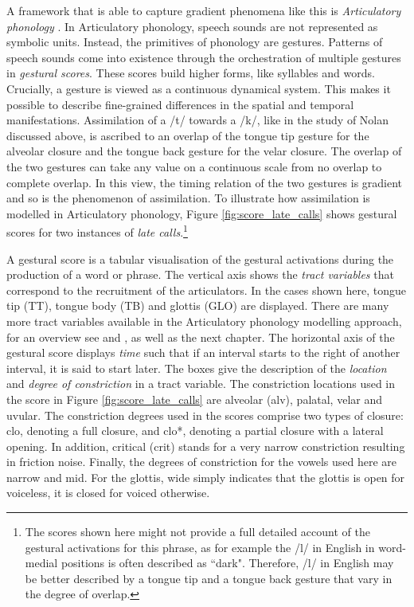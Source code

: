 A framework that is able to capture gradient phenomena like this is \emph{Articulatory phonology} \citep{BrowmanGoldstein1986,BrowmanGoldstein1992}. In Articulatory phonology, speech sounds are not represented as symbolic units. Instead, the primitives of phonology are gestures. Patterns of speech sounds come into existence through the orchestration of multiple gestures in \emph{gestural scores}. These scores build higher forms, like syllables and words. Crucially, a gesture is viewed as a continuous dynamical system. This makes it possible to describe fine-grained differences in the spatial and temporal manifestations. Assimilation of a /t/ towards a /k/, like in the study of Nolan discussed above, is ascribed to an overlap of the tongue tip gesture for the alveolar closure and the tongue back gesture for the velar closure. The overlap of the two gestures can take any value on a continuous scale from no overlap to complete overlap. In this view, the timing relation of the two gestures is gradient and so is the phenomenon of assimilation. To illustrate how assimilation is modelled in Articulatory phonology, Figure \ref{fig:score_late_calls} shows gestural scores for two instances of \emph{late calls}.\footnote{The scores shown here might not provide a full detailed account of the gestural activations for this phrase, as for example the /l/ in English in word-medial positions is often described as ``dark". Therefore, /l/ in English may be better described by a tongue tip and a tongue back gesture that vary in the degree of overlap.}

A gestural score is a tabular visualisation of the gestural activations during the production of a word or phrase. The vertical axis shows the \emph{tract variables} that correspond to the recruitment of the articulators. In the cases shown here, tongue tip (TT), tongue body (TB) and glottis (GLO) are displayed. There are many more tract variables available in the Articulatory phonology modelling approach, for an overview see \cite{BrowmanGoldstein1992} and \cite{Mücke2018}, as well as the next chapter. The horizontal axis of the gestural score displays \emph{time} such that if an interval starts to the right of another interval, it is said to start later. The boxes give the description of the \emph{location} and \emph{degree of constriction} in a tract variable. The constriction locations used in the score in Figure \ref{fig:score_late_calls} are alveolar (alv), palatal, velar and uvular. The constriction degrees used in the scores comprise two types of closure: clo, denoting a full closure, and clo*, denoting a partial closure with a lateral opening. In addition, critical (crit) stands for a very narrow constriction resulting in friction noise. Finally, the degrees of constriction for the vowels used here are narrow and mid. For the glottis, wide simply indicates that the glottis is open for voiceless, it is closed for voiced otherwise.

